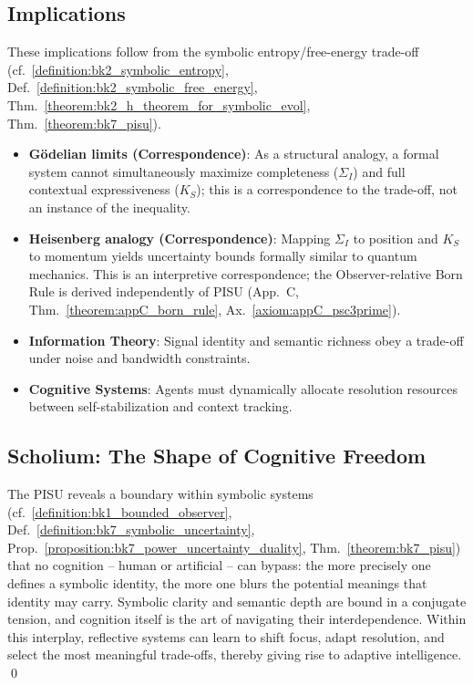 \subsection{Implications}
\label{subsec:bk7_pisu_implications}
These implications follow from the symbolic entropy/free-energy trade-off (cf.~\ref{definition:bk2_symbolic_entropy}, Def.~\ref{definition:bk2_symbolic_free_energy}, Thm.~\ref{theorem:bk2_h_theorem_for_symbolic_evol}, Thm.~\ref{theorem:bk7_pisu}).
\begin{itemize}
    \item \textbf{G\"odelian limits (Correspondence)}: As a structural analogy, a formal system cannot simultaneously maximize completeness ($\Sigma_I$) and full contextual expressiveness ($K_S$); this is a correspondence to the trade-off, not an instance of the inequality.
    \item \textbf{Heisenberg analogy (Correspondence)}: Mapping $\Sigma_I$ to position and $K_S$ to momentum yields uncertainty bounds formally similar to quantum mechanics. This is an interpretive correspondence; the Observer-relative Born Rule is derived independently of PISU (App.~C, Thm.~\ref{theorem:appC_born_rule}, Ax.~\ref{axiom:appC_psc3prime}).
    \item \textbf{Information Theory}: Signal identity and semantic richness obey a trade-off under noise and bandwidth constraints.
    \item \textbf{Cognitive Systems}: Agents must dynamically allocate resolution resources between self-stabilization and context tracking.
\end{itemize}

\subsection{Scholium: The Shape of Cognitive Freedom}
\label{subsec:bk7_pisu_scholium}
\begin{scholium}
The PISU reveals a boundary within symbolic systems (cf.~\ref{definition:bk1_bounded_observer}, Def.~\ref{definition:bk7_symbolic_uncertainty}, Prop.~\ref{proposition:bk7_power_uncertainty_duality}, Thm.~\ref{theorem:bk7_pisu}) that no cognition -- human or artificial -- can bypass: the more precisely one defines a symbolic identity, the more one blurs the potential meanings that identity may carry. Symbolic clarity and semantic depth are bound in a conjugate tension, and cognition itself is the art of navigating their interdependence. Within this interplay, reflective systems can learn to shift focus, adapt resolution, and select the most meaningful trade-offs, thereby giving rise to adaptive intelligence. \qed
\end{scholium}
